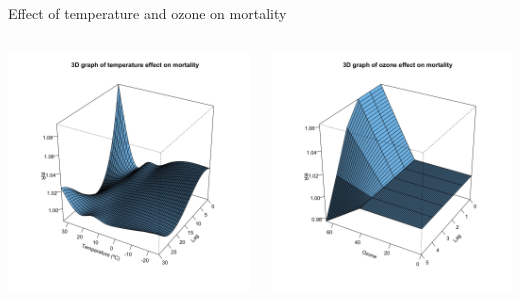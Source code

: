 \documentclass[english]{beamer}
\begin{document}
\begin{frame}{Effect of temperature and ozone on mortality}
\begin{columns}
    \begin{column}{0.6\textwidth}
        \centering
        \includegraphics[width=\linewidth]{images/dlnm_example_1.jpeg}
    \end{column}
    \begin{column}{0.6\textwidth}
        \centering
        \includegraphics[width=\linewidth]{images/dlnm_example_1_2.jpeg}
    \end{column}
\end{columns}
\end{frame}
\end{document}
